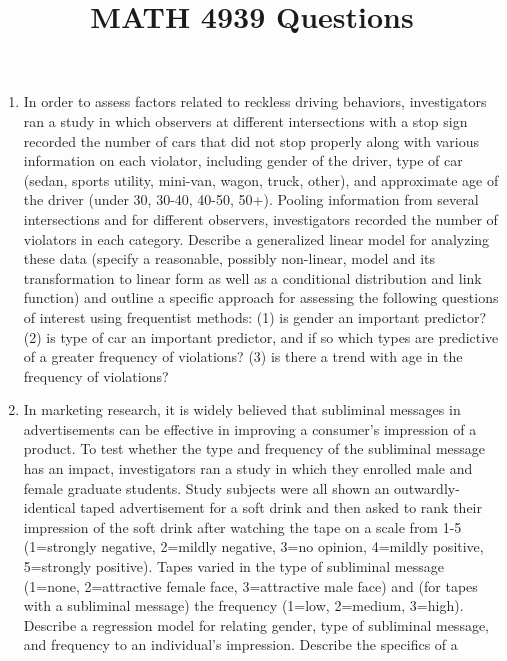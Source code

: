 \documentclass[
]{article}
\title{MATH 4939 Questions}
\author{}
\date{\vspace{-2.5em}}
\begin{document}
\maketitle

\begin{enumerate}
\def\labelenumi{\arabic{enumi}.}
\item
  In order to assess factors related to reckless driving behaviors,
  investigators ran a study in which observers at different
  intersections with a stop sign recorded the number of cars that did
  not stop properly along with various information on each violator,
  including gender of the driver, type of car (sedan, sports utility,
  mini-van, wagon, truck, other), and approximate age of the driver
  (under 30, 30-40, 40-50, 50+). Pooling information from several
  intersections and for different observers, investigators recorded the
  number of violators in each category. \newline  Describe a generalized
  linear model for analyzing these data (specify a reasonable, possibly
  non-linear, model and its transformation to linear form as well as a
  conditional distribution and link function) and outline a specific
  approach for assessing the following questions of interest using
  frequentist methods: (1) is gender an important predictor? (2) is type
  of car an important predictor, and if so which types are predictive of
  a greater frequency of violations? (3) is there a trend with age in
  the frequency of violations? \vspace{0px}
\item
  In marketing research, it is widely believed that subliminal messages
  in advertisements can be effective in improving a consumer's
  impression of a product. To test whether the type and frequency of the
  subliminal message has an impact, investigators ran a study in which
  they enrolled male and female graduate students. Study subjects were
  all shown an outwardly-identical taped advertisement for a soft drink
  and then asked to rank their impression of the soft drink after
  watching the tape on a scale from 1-5 (1=strongly negative, 2=mildly
  negative, 3=no opinion, 4=mildly positive, 5=strongly positive). Tapes
  varied in the type of subliminal message (1=none, 2=attractive female
  face, 3=attractive male face) and (for tapes with a subliminal
  message) the frequency (1=low, 2=medium, 3=high). \newline Describe a
  regression model for relating gender, type of subliminal message, and
  frequency to an individual's impression. Describe the specifics of a

\end{enumerate}
\end{document}
